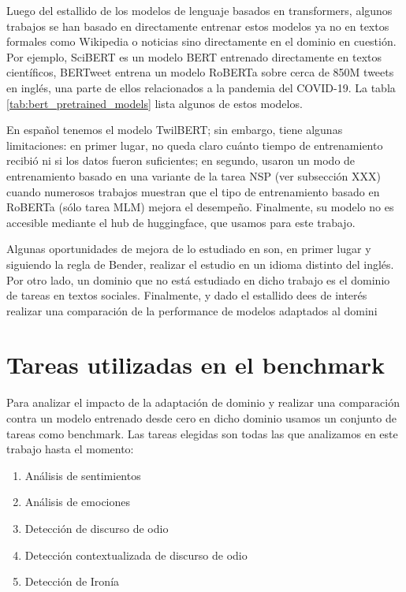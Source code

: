 Luego del estallido de los modelos de lenguaje basados en transformers, algunos trabajos se han basado en directamente entrenar estos modelos ya no en textos formales como Wikipedia o noticias sino directamente en el dominio en cuestión. Por ejemplo, SciBERT \cite{beltagy-etal-2019-scibert} es un modelo BERT entrenado directamente en textos científicos, BERTweet \cite{bertweet} entrena un modelo RoBERTa\cite{liu2019roberta} sobre cerca de 850M tweets en inglés, una parte de ellos relacionados a la pandemia del COVID-19. La tabla \ref{tab:bert_pretrained_models} lista algunos de estos modelos.

En español tenemos el modelo TwilBERT\cite{gonzalez2021twilbert}; sin embargo, tiene algunas limitaciones: en primer lugar, no queda claro cuánto tiempo de entrenamiento recibió ni si los datos fueron suficientes; en segundo, usaron un modo de entrenamiento basado en una variante de la tarea NSP (ver subsección XXX) cuando numerosos trabajos muestran que el tipo de entrenamiento basado en RoBERTa (sólo tarea MLM) mejora el desempeño. Finalmente, su modelo no es accesible mediante el hub de huggingface, que usamos para este trabajo.


Algunas oportunidades de mejora de lo estudiado en \citet{gururangan-etal-2020-dont} son, en primer lugar y siguiendo la regla de Bender\cite{bender2011achieving}, realizar el estudio en un idioma distinto del inglés. Por otro lado, un dominio que no está estudiado en dicho trabajo es el dominio de tareas en textos sociales. Finalmente, y dado el estallido dees de interés realizar una comparación de la performance de modelos adaptados al domini

\section{Tareas utilizadas en el benchmark}

Para analizar el impacto de la adaptación de dominio y realizar una comparación contra un modelo entrenado desde cero en dicho dominio usamos un conjunto de tareas como benchmark. Las tareas elegidas son todas las que analizamos en este trabajo hasta el momento:

\begin{enumerate}
    \item Análisis de sentimientos
    \item Análisis de emociones
    \item Detección de discurso de odio
    \item Detección contextualizada de discurso de odio
    \item Detección de Ironía
\end{enumerate}

